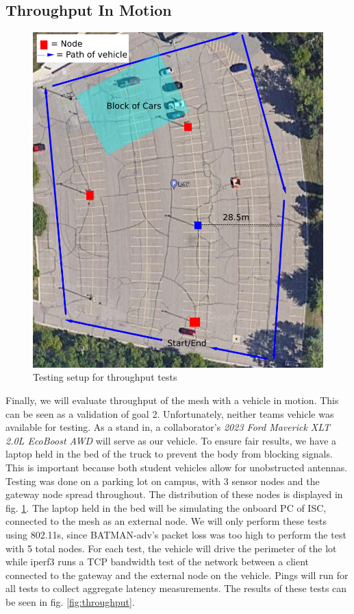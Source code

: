 \documentclass[journal]{IEEEtran}
\begin{document}
\subsection{Throughput In Motion}

\begin{figure}[t]
    \centering
    \includegraphics[width=\linewidth]{images/testing_lot.png}
    \caption{Testing setup for throughput tests}
    \label{fig:lot}
\end{figure}

Finally, we will evaluate throughput of the mesh with a vehicle in motion. This can be seen as a validation of goal 2. Unfortunately, neither teams vehicle was available for testing. As a stand in, a collaborator's \textit{2023 Ford Maverick XLT 2.0L EcoBoost AWD} will serve as our vehicle. To ensure fair results, we have a laptop held in the bed of the truck to prevent the body from blocking signals. This is important because both student vehicles allow for unobstructed antennas. Testing was done on a parking lot on campus, with 3 sensor nodes and the gateway node spread throughout. The distribution of these nodes is displayed in fig. \ref{fig:lot}. The laptop held in the bed will be simulating the onboard PC of ISC, connected to the mesh as an external node. We will only perform these tests using 802.11s, since BATMAN-adv's packet loss was too high to perform the test with 5 total nodes. For each test, the vehicle will drive the perimeter of the lot while iperf3 runs a TCP bandwidth test of the network between a client connected to the gateway and the external node on the vehicle. Pings will run for all tests to collect aggregate latency measurements. The results of these tests can be seen in fig. \ref{fig:throughput}.
\end{document}
